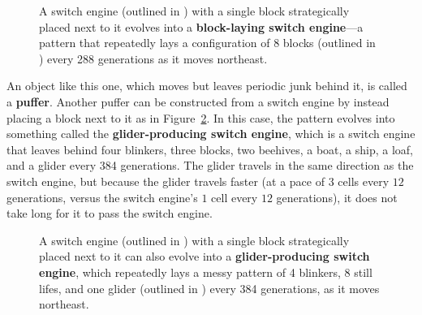 \begin{figure}[!htb]
	\centering{}
	\caption{A switch engine (outlined in ) with a single block strategically placed next to it evolves into a \textbf{block-laying switch engine}---a pattern that repeatedly lays a configuration of 8 blocks (outlined in ) every 288 generations as it moves northeast.}\label{fig:switch_engine_block}
\end{figure}

An object like this one, which moves but leaves periodic junk behind it, is called a \textbf{puffer}. Another puffer can be constructed from a switch engine by instead placing a block next to it as in Figure~\ref{fig:switch_engine_glider}. In this case, the pattern evolves into something called the \textbf{glider-producing switch engine}, which is a switch engine that leaves behind four blinkers, three blocks, two beehives, a boat, a ship, a loaf, and a glider every 384 generations. The glider travels in the same direction as the switch engine, but because the glider travels faster (at a pace of $3$ cells every $12$ generations, versus the switch engine's $1$ cell every $12$ generations), it does not take long for it to pass the switch engine.

\begin{figure}[!htb]
	\centering{}
	\caption{A switch engine (outlined in ) with a single block strategically placed next to it can also evolve into a \textbf{glider-producing switch engine}, which repeatedly lays a messy pattern of 4 blinkers, 8 still lifes, and one glider (outlined in ) every 384 generations, as it moves northeast.}\label{fig:switch_engine_glider}
\end{figure}

